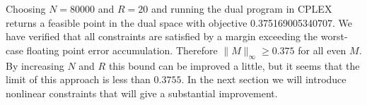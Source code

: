 \documentclass[12pt]{article}
\newcommand{\fl}{\text{fl}}
\numberwithin{equation}{section}
\begin{document}







Choosing $N = 80000$ and $R = 20$ and running the dual program in CPLEX returns a feasible point in the dual space with objective 0.375169005340707. We have verified that all constraints are satisfied by a margin exceeding the worst-case floating point error accumulation. Therefore $\|M \|_{\infty} \geq 0.375$ for all even $M$. By increasing $N$ and $R$ this bound can be improved a little, but it seems that the limit of this approach is less than $0.3755$. In the next section we will introduce nonlinear constraints that will give a substantial improvement. 
\end{document}
